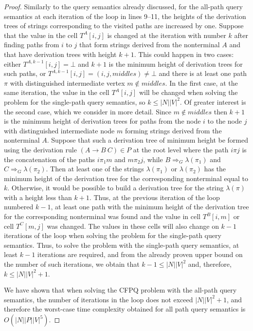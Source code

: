 \begin{proof}
Similarly to the query semantics already discussed, for the all-path query semantics at each iteration of the loop in lines 9--11, the heights of the derivation trees of strings corresponding to the visited paths are increased by one. Suppose that the value in the cell $T^{A}[i, j]$ is changed at the iteration with number $k$ after finding paths from $i$ to $j$ that form strings derived from the nonterminal $A$ and that have derivation trees with height $k + 1$. This could happen in two cases: either $T^{A, k - 1}[i, j] = \bot$ and $k + 1$ is the minimum height of derivation trees for such paths, or $T^{A, k - 1}[i, j] = (i, j, \textit{middles}) \neq \bot$ and there is at least one path $\pi$ with distinguished intermediate vertex $m \notin \textit{middles}$. In the first case, at the same iteration, the value in the cell $T^{A}[i, j]$ will be changed when solving the problem for the single-path query semantics, so $k \leq |N||V|^2$. Of greater interest is the second case, which we consider in more detail. Since $m \notin \textit{middles}$ then $k + 1$ is the minimum height of derivation trees for paths from the node $i$ to the node $j$ with distinguished intermediate node $m$ forming strings derived from the nonterminal $A$. Suppose that such a derivation tree of minimum height be formed using the derivation rule $(A \to B \ C) \in P$ at the root level where the path $i \pi j$ is the concatenation of the paths $i \pi_1 m$ and $m \pi_2 j$, while $B \Rightarrow_G \lambda(\pi_1)$ and $C \Rightarrow_G \lambda(\pi_2)$. Then at least one of the strings $\lambda(\pi_1)$ or $\lambda(\pi_2)$ has the minimum height of the derivation tree for the corresponding nonterminal equal to $k$. Otherwise, it would be possible to build a derivation tree for the string $\lambda(\pi)$ with a height less than $k + 1$. Thus, at the previous iteration of the loop numbered $k - 1$, at least one path with the minimum height of the derivation tree for the corresponding nonterminal was found and the value in cell $T^{B}[i, m]$ or cell $T^{C}[m, j]$ was changed. The values in these cells will also change on $k - 1$ iterations of the loop when solving the problem for the single-path query semantics. Thus, to solve the problem with the single-path query semantics, at least $k - 1$ iterations are required, and from the already proven upper bound on the number of such iterations, we obtain that $k - 1 \leq |N||V|^2$ and, therefore, $k \leq |N||V|^2 + 1$.

We have shown that when solving the CFPQ problem with the all-path query semantics, the number of iterations in the loop does not exceed $|N||V|^2 + 1$, and therefore the worst-case time complexity obtained for all path query semantics is $O(|N||P||V|^5)$.
\end{proof}

